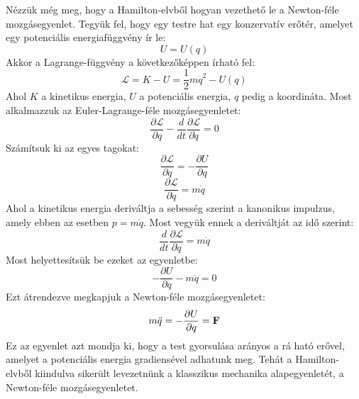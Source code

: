 \documentclass[../main.tex]{subfiles}
\begin{document}
Nézzük még meg, hogy a Hamilton-elvből hogyan vezethető le a Newton-féle mozgásegyenlet. Tegyük fel, hogy egy testre hat egy konzervatív erőtér, amelyet egy potenciális energiafüggvény ír le:
\begin{equation}
    U = U(q)
\end{equation}
Akkor a Lagrange-függvény a következőképpen írható fel:
\begin{equation}
    \mathcal{L} = K - U = \frac{1}{2}m \dot{q}^2 - U(q)
\end{equation}
Ahol $K$ a kinetikus energia, $U$ a potenciális energia, $q$ pedig a koordináta. Most alkalmazzuk az Euler-Lagrange-féle mozgásegyenletet:
\begin{equation}
    \frac{\partial \mathcal{L}}{\partial q} - \frac{d}{dt} \frac{\partial \mathcal{L}}{\partial \dot{q}} = 0
\end{equation}
Számítsuk ki az egyes tagokat:
\begin{equation}
    \frac{\partial \mathcal{L}}{\partial q} = - \frac{\partial U}{\partial q}
\end{equation}
\begin{equation}
    \frac{\partial \mathcal{L}}{\partial \dot{q}} = m \dot{q}
\end{equation}
Ahol a kinetikus energia deriváltja a sebesség szerint a kanonikus impulzus, amely ebben az esetben $p = m \dot{q}$. Most vegyük ennek a deriváltját az idő szerint:
\begin{equation}
    \frac{d}{dt} \frac{\partial \mathcal{L}}{\partial \dot{q}} = m \ddot{q}
\end{equation}
Most helyettesítsük be ezeket az egyenletbe:
\begin{equation}
    - \frac{\partial U}{\partial q} - m \ddot{q} = 0
\end{equation}
Ezt átrendezve megkapjuk a Newton-féle mozgásegyenletet:
\begin{equation}
    m \ddot{q} = - \frac{\partial U}{\partial q} = \bold{F}
\end{equation}
Ez az egyenlet azt mondja ki, hogy a test gyorsulása arányos a rá ható erővel, amelyet a potenciális energia gradiensével adhatunk meg. Tehát a Hamilton-elvből kiindulva sikerült levezetnünk a klasszikus mechanika alapegyenletét, a Newton-féle mozgásegyenletet.
\end{document}
